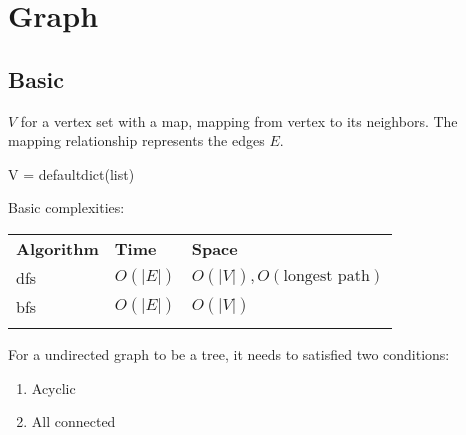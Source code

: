 \chapter{Graph}

\section{Basic}
 $V$ for a vertex set with a map, mapping from vertex to its neighbors. The mapping relationship represents the edges $E$.
\begin{python}
V = defaultdict(list)
\end{python}

 Basic complexities: 

\begin{tabular}{lll}
\hline\noalign{\smallskip}
\textbf{Algorithm} & \textbf{Time}  & \textbf{Space}\\
\noalign{\smallskip}\hline\noalign{\smallskip}
dfs & $O(|E|)$ & $O(|V|), O(\text{longest path})$ \\
bfs & $O(|E|)$ & $O(|V|)$ \\
\noalign{\smallskip}\hline\noalign{\smallskip}
\caption{CAPTIONS}
\end{tabular}

 For a undirected graph to be a tree, it needs to satisfied two conditions:
\begin{enumerate}
\item Acyclic 
\item All connected 
\end{enumerate}
